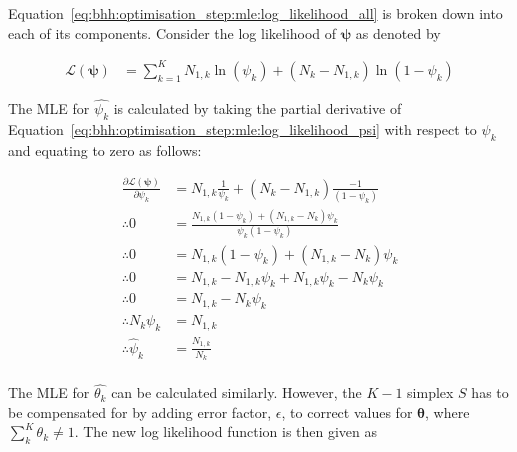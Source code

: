 Equation~\eqref{eq:bhh:optimisation_step:mle:log_likelihood_all} is broken down into each of its components. Consider the log likelihood of $\boldsymbol{\psi}$ as denoted by

\begin{equation}
      \label{eq:bhh:optimisation_step:mle:log_likelihood_psi}
      \begin{split}
            \mathcal{L}(\boldsymbol{\psi}) &=  \sum_{k=1}^{K} N_{1,k} \ln \left( \psi_{k} \right) + \left( N_{k} - N_{1,k} \right) \ln \left( 1 - \psi_{k} \right)
      \end{split}
\end{equation}

The \acs{MLE} for $\hat{\psi_{k}} $ is calculated by taking the partial derivative of Equation~\eqref{eq:bhh:optimisation_step:mle:log_likelihood_psi} with respect to $\psi_{k}$ and equating to zero as follows:

\begin{equation}
      \label{eq:bhh:optimisation_step:mle:proof_log_likelihood_psi}
      \begin{split}
            \frac{\partial \mathcal{L}(\boldsymbol{\psi})}{\partial \psi_{k}} &= N_{1,k} \frac{1}{ \psi_{k}} + \left( N_{k} - N_{1,k} \right) \frac{-1}{ \left( 1 - \psi_{k} \right) } \\
            \therefore 0 &=  \frac{ N_{1,k} \left( 1 - \psi_{k} \right) +  \left( N_{1,k} - N_{k} \right) \psi_{k}}{ \psi_{k} \left( 1 - \psi_{k} \right) } \\
            \therefore 0 &=  N_{1,k} \left( 1 - \psi_{k} \right) +  \left( N_{1,k} - N_{k} \right) \psi_{k} \\
            \therefore 0 &=  N_{1,k} - N_{1,k} \psi_{k}  +  N_{1,k} \psi_{k} - N_{k}\psi_{k} \\
            \therefore 0 &=  N_{1,k} - N_{k}\psi_{k} \\
            \therefore N_{k}\psi_{k} &=  N_{1,k} \\
            \therefore \hat{\psi}_{k} &=  \frac{N_{1,k}}{N_{k}} \\
      \end{split}
\end{equation}

The \acs{MLE} for $\hat{\theta_{k}} $ can be calculated similarly. However, the $K-1$ simplex $S$ has to be compensated for by adding error factor, $\epsilon$, to correct values for $\boldsymbol{\theta}$, where $\sum_{k}^{K} \theta_{k} \neq 1$. The new log likelihood function is then given as

